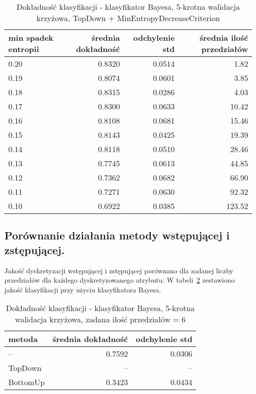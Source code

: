 \begin{table}[h!]
\begin{center}
\begin{tabular}{lrrr}
\toprule
min spadek entropii &  średnia dokładność &  odchylenie std & średnia ilość przedziałów \\
\midrule
0.20 & 0.8320 & 0.0514 & 1.82 \\
0.19 & 0.8074 & 0.0601 & 3.85 \\
0.18 & 0.8315 & 0.0286 & 4.03 \\
0.17 & 0.8300 & 0.0633 & 10.42 \\
0.16 & 0.8108 & 0.0681 & 15.46 \\
0.15 & 0.8143 & 0.0425 & 19.39 \\
0.14 & 0.8118 & 0.0510 & 28.46 \\
0.13 & 0.7745 & 0.0613 & 44.85 \\
0.12 & 0.7362 & 0.0682 & 66.90 \\
0.11 & 0.7271 & 0.0630 & 92.32 \\
0.10 & 0.6922 & 0.0385 & 123.52 \\
\bottomrule
\end{tabular}
\caption{Dokładność klasyfikacji - klasyfikator Bayesa, 5-krotna walidacja krzyżowa, TopDown + MinEntropyDecreaseCriterion}
\label{tab:bayes_min_entropy}
\end{center}
\end{table}

\subsection{Porównanie działania metody wstępującej i zstępującej.}
Jakość dyskretyzacji wstępującej i zstępującej porównano dla zadanej liczby przedziałów dla każdego dyskretyzowanego atrybutu. W tabeli~\ref{tab:bayes_td_bu_comp_full_set} zestawiono jakość klasyfikacji przy użyciu klasyfikatora Bayesa.

\begin{table}[h!]
\begin{center}
\begin{tabular}{lrr}
\toprule
metoda & średnia dokładność & odchylenie std \\
\midrule
--      & 0.7592	& 0.0306 \\
TopDown & --		& --	\\
BottomUp& 0.3423	& 0.0434	\\
\bottomrule
\end{tabular}
\caption{Dokładność klasyfikacji - klasyfikator Bayesa, 5-krotna walidacja krzyżowa, zadana ilość przedziałów = 6}
\label{tab:bayes_td_bu_comp_full_set}
\end{center}
\end{table}

